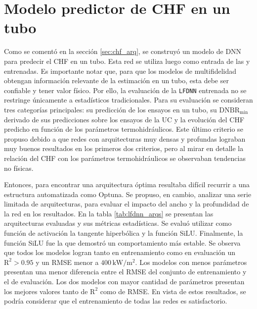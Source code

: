 \section{Modelo predictor de CHF en un tubo}
\label{app_chf_lfdnn_resultados}
Como se comentó en la sección \ref{sec:chf_arq}, se construyó un modelo de DNN para predecir el CHF en un tubo. Esta red se utiliza luego como entrada de las \mfdnn{} y \mfpinn{} entrenadas. Es importante notar que, para que los modelos de multifidelidad obtengan información relevante de la estimación en un tubo, esta debe ser confiable y tener valor físico. Por ello, la evaluación de la \texttt{LFDNN} entrenada no se restringe únicamente a estadísticos tradicionales. Para su evaluación se consideran tres categorías principales: su predicción de los ensayos en un tubo, su $\mathrm{DNBR}_\mathrm{min}$ derivado de sus predicciones sobre los ensayos de la UC y la evolución del CHF predicho en función de los parámetros termohidráulicos. Este último criterio se propuso debido a que redes con arquitecturas muy densas y profundas lograban muy buenos resultados en los primeros dos criterios, pero al mirar en detalle la relación del CHF con los parámetros termohidráulicos se observaban tendencias no físicas.

Entonces, para encontrar una arquitectura óptima resultaba difícil recurrir a una estructura automatizada como Optuna. Se propuso, en cambio, analizar una serie limitada de arquitecturas, para evaluar el impacto del ancho y la profundidad de la red en los resultados. En la tabla \ref{tab:lfdnn_arqs} se presentan las arquitecturas evaluadas y sus métricas estadísticas. Se evaluó utilizar como función de activación la tangente hiperbólica y la función SiLU. Finalmente, la función SiLU fue la que demostró un comportamiento más estable.
Se observa que todos los modelos logran tanto en entrenamiento como en evaluación un $\mathrm{R}^2>0.95$ y un RMSE menor a $400\,\mathrm{kW/m^2}$. Los modelos con menos parámetros presentan una menor diferencia entre el RMSE del conjunto de entrenamiento y el de evaluación. Los dos modelos con mayor cantidad de parámetros presentan los mejores valores tanto de $\mathrm{R}^2$ como de RMSE. En vista de estos resultados, se podría considerar que el entrenamiento de todas las redes es satisfactorio.

